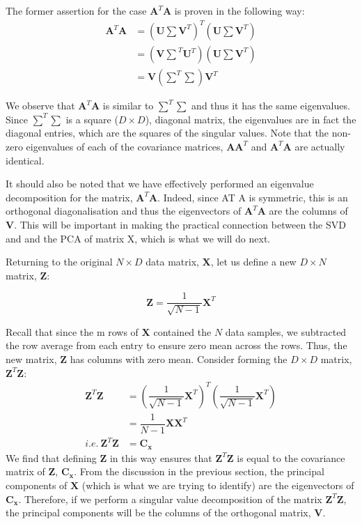 \newpage The former assertion for the case $\pmb{A}^T\pmb{A}$ is proven in the following way:
\begin{align*}
\pmb{A}^T\pmb{A}  &= (\pmb{U\sum V}^T)^T(\pmb{U\sum V}^T)\\
										   &= (\pmb{V\sum}^T\pmb{U}^T)(\pmb{U\sum V}^T)\\
										   &= \pmb{V}(\sum^T\sum)\pmb{V}^T
\end{align*}

We observe that $\pmb{A}^T\pmb{A}$ is similar to $\sum^T\sum$ and thus it has the same eigenvalues. Since $\sum^T\sum$ is a square ($D \times D$), diagonal matrix, the eigenvalues are in fact the diagonal entries, which are the squares of the singular values. Note that the non-zero eigenvalues of each of the covariance matrices, $\pmb{AA}^T$ and $\pmb{A}^T\pmb{A}$ are actually identical.


It should also be noted that we have effectively performed an eigenvalue decomposition for the matrix, $\pmb{A}^T\pmb{A}$. Indeed, since AT A is symmetric, this is an orthogonal diagonalisation and thus the eigenvectors of $\pmb{A}^T\pmb{A}$ are the columns of $\pmb{V}$. This will be important in making the practical connection between the SVD and and the PCA of matrix X, which is what we will do next.


Returning to the original $N \times D$ data matrix, $\pmb{X}$, let us define a new $D \times N$ matrix, $\pmb{Z}$:

$$\pmb{Z} = \dfrac{1}{\sqrt{N-1}}\pmb{X}^T$$

Recall that since the m rows of $\pmb{X}$ contained the $N$ data samples, we subtracted the row average from each entry to ensure zero mean across the rows. Thus, the new matrix, $\pmb{Z}$ has columns with zero mean. Consider forming the $D \times D$ matrix, $\pmb{Z}^T\pmb{Z}$:
\begin{align*}
\pmb{Z}^T\pmb{Z} &= (\dfrac{1}{\sqrt{N-1}}\pmb{X}^T)^T(\dfrac{1}{\sqrt{N-1}}\pmb{X}^T)\\
&= \dfrac{1}{N-1}\pmb{XX}^T\\
i.e. \  \pmb{Z}^T\pmb{Z} &= \pmb{C_x}
\end{align*}
We find that defining $\pmb{Z}$ in this way ensures that $\pmb{Z}^T\pmb{Z}$ is equal to the covariance matrix of $\pmb{Z}$, $\pmb{C_x}$. From the discussion in the previous section, the principal components of $\pmb{X}$ (which is what we are trying to identify) are the eigenvectors of $\pmb{C_x}$. Therefore, if we perform a singular value decomposition of the matrix $\pmb{Z}^T\pmb{Z}$, the principal components will be the columns of the orthogonal matrix, $\pmb{V}$.

